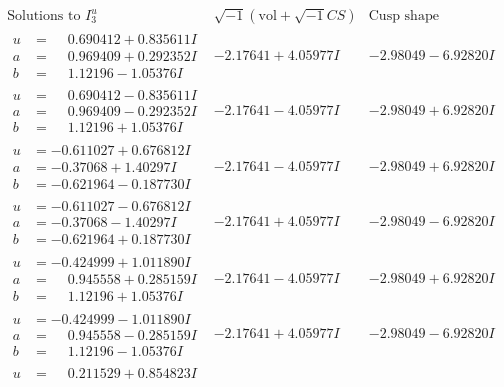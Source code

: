 \documentclass[1p]{elsarticle_modified}
\theoremstyle{definition}
\newcommand{\I}{\sqrt{-1}}
\begin{document}
$$\begin{array}{c|c|c}  
\text{Solutions to }I^u_{3}& \I (\text{vol} + \sqrt{-1}CS) & \text{Cusp shape}\\
 \hline 
\begin{aligned}
u &= \phantom{-}0.690412 + 0.835611 I \\
a &= \phantom{-}0.969409 + 0.292352 I \\
b &= \phantom{-}1.12196 - 1.05376 I\end{aligned}
 & -2.17641 + 4.05977 I & -2.98049 - 6.92820 I \\ \hline\begin{aligned}
u &= \phantom{-}0.690412 - 0.835611 I \\
a &= \phantom{-}0.969409 - 0.292352 I \\
b &= \phantom{-}1.12196 + 1.05376 I\end{aligned}
 & -2.17641 - 4.05977 I & -2.98049 + 6.92820 I \\ \hline\begin{aligned}
u &= -0.611027 + 0.676812 I \\
a &= -0.37068 + 1.40297 I \\
b &= -0.621964 - 0.187730 I\end{aligned}
 & -2.17641 - 4.05977 I & -2.98049 + 6.92820 I \\ \hline\begin{aligned}
u &= -0.611027 - 0.676812 I \\
a &= -0.37068 - 1.40297 I \\
b &= -0.621964 + 0.187730 I\end{aligned}
 & -2.17641 + 4.05977 I & -2.98049 - 6.92820 I \\ \hline\begin{aligned}
u &= -0.424999 + 1.011890 I \\
a &= \phantom{-}0.945558 + 0.285159 I \\
b &= \phantom{-}1.12196 + 1.05376 I\end{aligned}
 & -2.17641 - 4.05977 I & -2.98049 + 6.92820 I \\ \hline\begin{aligned}
u &= -0.424999 - 1.011890 I \\
a &= \phantom{-}0.945558 - 0.285159 I \\
b &= \phantom{-}1.12196 - 1.05376 I\end{aligned}
 & -2.17641 + 4.05977 I & -2.98049 - 6.92820 I \\ \hline\begin{aligned}
u &= \phantom{-}0.211529 + 0.854823 I \\

\end{aligned}
\end{array}$$
\end{document}
